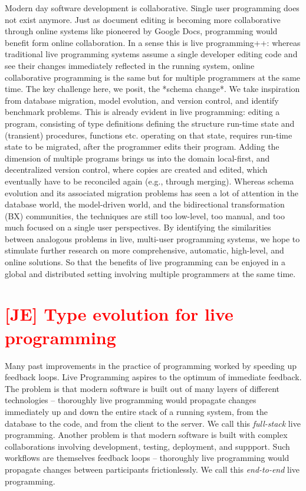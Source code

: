 \documentclass[english,submission]{programming}
\begin{document}
Modern day software development is collaborative. Single user programming does not exist anymore.
Just as document editing is becoming more collaborative through online systems like pioneered by Google Docs,
programming would benefit form online collaboration. In a sense this is live programming++: whereas traditional
live programming systems assume a single developer editing code and see their changes immediately reflected
in the running system, online collaborative programming is the same but for multiple programmers at the same time.
The key challenge here, we posit, the *schema change*. We take inspiration from database migration,
model evolution, and version control, and identify benchmark problems. This is already evident in live programming:
editing a program, consisting of type definitions defining the structure run-time state and (transient) procedures, functions
etc. operating on that state, requires run-time state to be migrated, after the programmer edits their program.
Adding the dimension of multiple programs brings us into the domain local-first, and decentralized version control, where
copies are created and edited, which eventually have to be reconciled again (e.g., through merging).
Whereas schema evolution and its associated migration problems has seen a lot of attention in the database world,
the model-driven world, and the bidirectional transformation (BX) communities, the techniques are still too low-level,
too manual, and too much focused on a single user perspectives. By identifying the similarities between analogous
problems in live, multi-user programming systems, we hope to stimulate further research on more comprehensive, automatic,
high-level, and online solutions. So that the benefits of live programming can be enjoyed in a global and distributed setting
involving multiple programmers at the same time.

\section{\textcolor{red}{[JE] Type evolution for live programming}}

Many past improvements in the practice of programming worked by speeding up feedback loops. Live Programming aspires to the optimum of immediate feedback. The problem is that modern software is built out of many layers of different technologies -- thoroughly live programming would propagate changes immediately up and down the entire stack of a running system, from the database to the code, and from the client to the server. We call this \textit{full-stack} live programming. Another problem is that modern software is built with complex collaborations involving development, testing, deployment, and suppport. Such workflows are themselves feedback loops -- thoroughly live programming would propagate changes between participants frictionlessly. We call this \textit{end-to-end} live programming.
\end{document}
